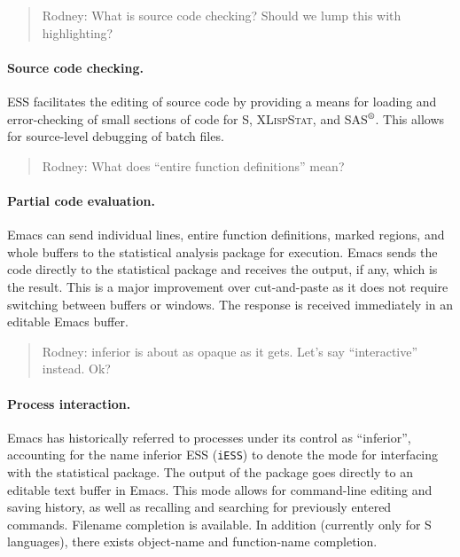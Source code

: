 \documentclass{article}
\newcommand*{\SAS}{\textsc{SAS}$^{\mbox{\scriptsize\textregistered}}$}
\newcommand*{\XLispStat}{\textsc{XLispStat}}
\newcommand*{\Stata}{\textsc{Stata}}
\newcommand{\stexttt}[1]{{\small\texttt{#1}}}
\begin{document}
\begin{quote}
 Rodney:  What is source code checking?  Should we lump this with highlighting?
\end{quote}

\paragraph{Source code checking.}
ESS facilitates the editing of source code by providing a means for
loading and error-checking of small sections of code for S,
\XLispStat, and \SAS.  This allows for source-level debugging of batch
files.

\begin{quote}
 Rodney:  What does ``entire function definitions'' mean?
\end{quote}

\paragraph{Partial code evaluation.}
Emacs can send individual lines, entire function definitions, marked
regions, and whole buffers to the statistical analysis package for
execution.  Emacs sends the code directly to
the statistical package and receives the output, if any, which is
the result.  This is a major improvement over cut-and-paste as it does
not require switching between buffers or windows.  The response is received
immediately in an editable Emacs buffer.

\begin{quote}
 Rodney:  inferior is about as opaque as it gets.  Let's say
``interactive'' instead.  Ok?
\end{quote}

\paragraph{Process interaction.}
Emacs has historically referred to processes under its control as
``inferior'', accounting for the name inferior ESS (\stexttt{iESS}) to
denote the mode for interfacing with the statistical package.  The
output of the package goes directly to an editable text buffer in Emacs.
This mode allows for command-line editing and saving history, as well as
recalling and searching for previously entered commands.  Filename
completion is available.  In addition (currently only for S languages),
there exists object-name and function-name completion.
\end{document}
